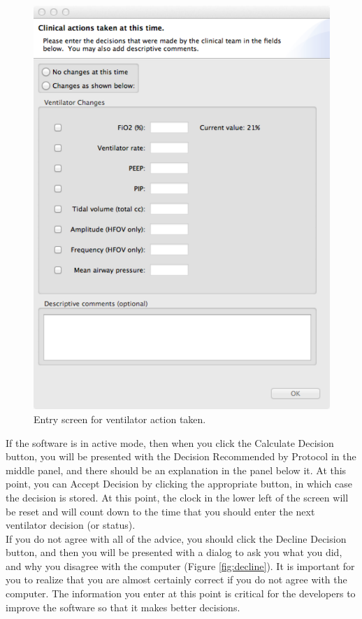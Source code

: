 \begin{figure}[htbp] 
   \centering
   \includegraphics[width=\textwidth]{ActionTaken} 
   \caption{Entry screen for ventilator action taken.}
   \label{fig:actionTaken}
\end{figure}
 
If the software is in active mode, then when you click the Calculate Decision button, you will be presented with the
Decision Recommended by Protocol in the middle panel, and there should be an explanation in the panel below it.  At this
point, you can Accept Decision by clicking the appropriate button, in which case the decision is stored.  At this point,
the clock in the lower left of the screen will be reset and will count down to the time that you should enter the next
ventilator decision (or status).  \\

If you do not agree with all of the advice, you should click the Decline Decision button, and then you will be presented with
a dialog to ask you what you did, and why you disagree with the computer (Figure \vref{fig:decline}).  It is important
for you to realize that you are almost certainly correct if you do not agree with the computer.  The information you enter
at this point is critical for the developers to improve the software so that it makes better decisions.

